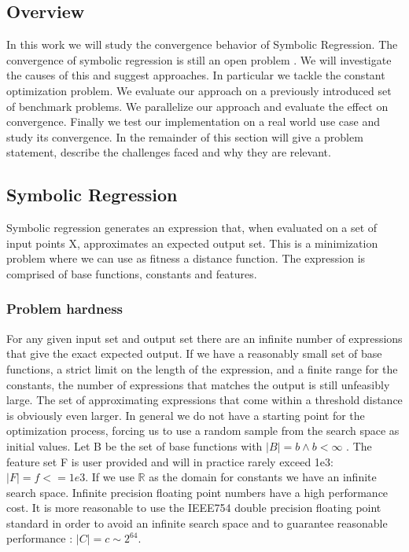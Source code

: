 \subsection{Overview}
In this work we will study the convergence behavior of Symbolic Regression. The convergence of symbolic regression is still an open problem \cite{SRBaseline, SRAccur, SRAccuracy, FFX}. We will investigate the causes of this and suggest approaches. In particular we tackle the constant optimization problem. We evaluate our approach on a previously introduced \cite{SRBaseline} set of benchmark problems. We parallelize our approach and evaluate the effect on convergence. Finally we test our implementation on a real world use case and study its convergence.
In the remainder of this section will give a problem statement, describe the challenges faced and why they are relevant.

\subsection{Symbolic Regression}
Symbolic regression generates an expression that, when evaluated on a set of input points X, approximates an expected output set. This is a minimization problem where we can use as fitness a distance function. The expression is comprised of base functions, constants and features. 

\subsubsection{Problem hardness}
For any given input set and output set there are an infinite number of expressions that give the exact expected output. If we have a reasonably small set of base functions, a strict limit on the length of the expression, and a finite range for the constants, the number of expressions that matches the output is still unfeasibly large. The set of approximating expressions that come within a threshold distance is obviously even larger. In general we do not have a starting point for the optimization process, forcing us to use a random sample from the search space as initial values.
Let B be the set of base functions with $\vert B \vert = b \land b < \infty$ . The feature set F is user provided and will in practice rarely exceed 1e3: $\vert F \vert = f <= 1e3$. 
If we use $\mathbb{R}$ as the domain for constants we have an infinite search space. Infinite precision floating point numbers have a high performance cost. It is more reasonable to use the IEEE754  double precision floating point standard in order to avoid an infinite search space and to guarantee reasonable performance :  $\vert C \vert = c \sim 2^{64}$.

